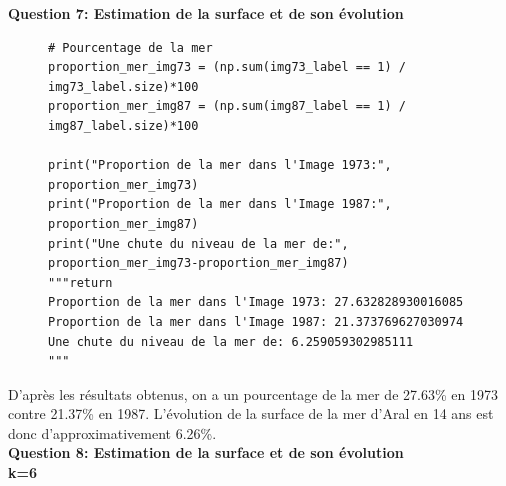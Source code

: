 \textbf{Question 7: Estimation de la surface et de son évolution}

\begin{figure}[!h]
    \begin{verbatim}
# Pourcentage de la mer
proportion_mer_img73 = (np.sum(img73_label == 1) / img73_label.size)*100
proportion_mer_img87 = (np.sum(img87_label == 1) / img87_label.size)*100

print("Proportion de la mer dans l'Image 1973:", proportion_mer_img73)
print("Proportion de la mer dans l'Image 1987:", proportion_mer_img87)
print("Une chute du niveau de la mer de:", proportion_mer_img73-proportion_mer_img87)
"""return
Proportion de la mer dans l'Image 1973: 27.632828930016085
Proportion de la mer dans l'Image 1987: 21.373769627030974
Une chute du niveau de la mer de: 6.259059302985111
"""
    \end{verbatim}   
\end{figure}

D'après les résultats obtenus, on a un pourcentage de la mer de 27.63\% en 1973 contre 21.37\% en 1987. L'évolution de la surface
de la mer d'Aral en 14 ans est donc d'approximativement 6.26\%. \\

\textbf{Question 8: Estimation de la surface et de son évolution} \\

\textbf{k=6}

